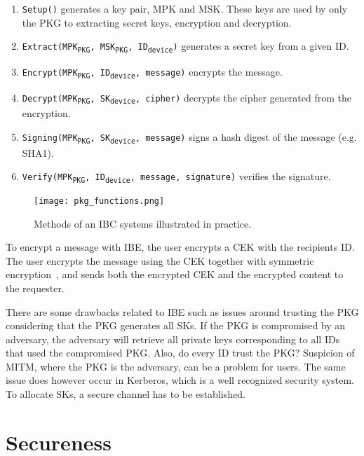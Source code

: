 \begin{enumerate}\label{ibc-methods}
  \item \texttt{Setup()} generates a key pair, \gls{MPK} and \gls{MSK}. These keys are used by only the \gls{PKG} to extracting secret keys, encryption and decryption.
  \item \texttt{Extract(MPK\textsubscript{PKG}, MSK\textsubscript{PKG}, ID\textsubscript{device})} generates a secret key from a given ID. 
  \item \texttt{Encrypt(MPK\textsubscript{PKG}, ID\textsubscript{device}, message)} encrypts the message.
  \item \texttt{Decrypt(MPK\textsubscript{PKG}, SK\textsubscript{device}, cipher)} decrypts the cipher generated from the encryption.
  \item \texttt{Signing(MPK\textsubscript{PKG}, SK\textsubscript{device}, message)} signs a hash digest of the message (e.g. \gls{SHA1}).
  \item \texttt{Verify(MPK\textsubscript{PKG}, ID\textsubscript{device}, message, signature)} verifies the signature.
\end{enumerate}

\begin{figure}[ht]
  \centering
  \texttt{[image: pkg\_functions.png]}
  \caption{Methods of an IBC systems illustrated in practice.}
  \label{fig:pkg_functions}
\end{figure}

To encrypt a message with \gls{IBE}, the user encrypts a \gls{CEK} with the recipients \gls{ID}.
The user encrypts the message using the \gls{CEK} together with symmetric encryption~\cite[section 2.2.2]{rfc5408}, and sends both the encrypted \gls{CEK} and the encrypted content to the requester. 


There are some drawbacks related to \gls{IBE} such as issues around trusting the \gls{PKG} considering that the \gls{PKG} generates all \gls{SK}s.  
If the \gls{PKG} is compromised by an adversary, the adversary will retrieve all private keys corresponding to all IDs that used the compromised \gls{PKG}. 
Also, do every ID trust the \gls{PKG}? 
Suspicion of \gls{MITM}, where the \gls{PKG} is the adversary, can be a problem for users.
The same issue does however occur in Kerberos, which is a well recognized security system. 
To allocate \gls{SK}s, a secure channel has to be established. 

\section{Secureness}\label{ibe-secureness}

